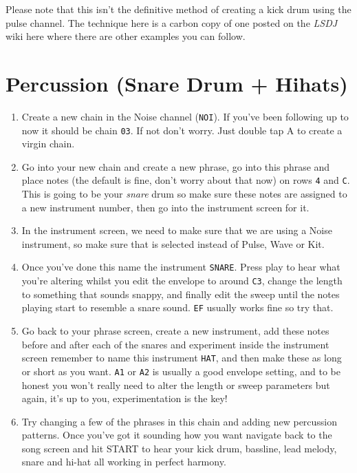 \documentclass[]{article}
\newcommand{\buttonStyle}[1]{\textsf{#1}\xspace}
\newcommand{\bA}{\buttonStyle{A}}
\newcommand{\bStart}{\buttonStyle{{START}}}
\newcommand{\nb}[1]{\texttt{#1}\xspace}
\newcommand{\lsdj}{\textit{LSDJ}\xspace}
\begin{document}
Please note that this isn't the definitive method of creating a kick drum using the pulse channel. The technique here is a carbon copy of one posted on the \lsdj wiki here where there are other examples you can follow.


\section{Percussion (Snare Drum + Hihats)}

\begin{enumerate}


\item Create a new chain in the Noise channel (\nb{NOI}). If you've been following up to now it should be chain \nb{03}. If not don't worry. Just double tap \bA to create a virgin chain.

\item Go into your new chain and create a new phrase, go into this phrase and place notes (the default is fine, don't worry about that now) on rows \nb{4} and \nb{C}. This is going to be your \textit{snare} drum so make sure these notes are assigned to a new instrument number, then go into the instrument screen for it.

\item In the instrument screen, we need to make sure that we are using a Noise instrument, so make sure that is selected instead of Pulse, Wave or Kit.

\item Once you've done this name the instrument \nb{SNARE}. Press play to hear what you're altering whilst you edit the envelope to around \nb{C3}, change the length to something that sounds snappy, and finally edit the sweep until the notes playing start to resemble a snare sound. \nb{EF} usually works fine so try that.

\item Go back to your phrase screen, create a new instrument, add these notes before and after each of the snares and experiment inside the instrument screen remember to name this instrument \nb{HAT}, and then make these as long or short as you want. \nb{A1} or \nb{A2} is usually a good envelope setting, and to be honest you won't really need to alter the length or sweep parameters but again, it's up to you, experimentation is the key!

\item Try changing a few of the phrases in this chain and adding new percussion patterns. Once you've got it sounding how you want navigate back to the song screen and hit \bStart to hear your kick drum, bassline, lead melody, snare and hi-hat all working in perfect harmony.

\end{enumerate}
\end{document}
